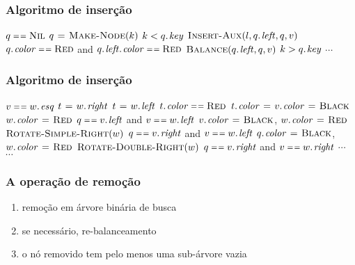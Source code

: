 \documentclass{beamer}
\begin{document}
\begin{frame}
\frametitle{Algoritmo de inserção}
\begin{codebox}
\li \If $q \isequal \const{Nil}$
\li \Then 
      $q \mathrel{\hspace{1pt}=\hspace{1pt}} \textnormal{\scshape Make-Node}(k)$
\li \ElseIf $k < \attrib{q}{key}$
\li \Then
      $\proc{Insert-Aux}(l, \attrib{q}{left}, q, v)$
\li   \If $\attrib{q}{color} \isequal \const{Red}$ and $\attrib{\attrib{q}{left}}{color} \isequal \const{Red}$
\li   \Then
        $\proc{Balance}(\attrib{q}{left}, q, v)$
      \End
\li \ElseIf $k > \attrib{q}{key}$
\li \Then
      $\cdots$
    \End    
\end{codebox}

\end{frame}

\begin{frame}
\frametitle{Algoritmo de inserção}
\begin{small}
\begin{codebox}
\li \If $v \isequal \attrib{w}{esq}$
\li \Then 
      $t \gets \attrib{w}{right}$
\li \Else
      $t \gets \attrib{w}{left}$
    \End
\li \If $\attrib{t}{color} \isequal \const{Red}$
\li \Then
      $\attrib{t}{color} \gets \attrib{v}{color} \gets \const{Black}$
\li   $\attrib{w}{color} \gets \const{Red}$
\li \Else
      \If $q \isequal \attrib{v}{left}$ and $v \isequal \attrib{w}{left}$
\li   \Then
        $\attrib{v}{color} \gets \const{Black}$, $\attrib{w}{color} \gets \const{Red}$
\li     $\textnormal{\scshape Rotate-Simple-Right}(w)$
\li   \ElseIf $q \isequal \attrib{v}{right}$ and $v \isequal \attrib{w}{left}$
\li     \Then
          $\attrib{q}{color} \gets \const{Black}$, $\attrib{w}{color} \gets \const{Red}$
\li     $\textnormal{\scshape Rotate-Double-Right}(w)$
\li   \ElseIf $q \isequal \attrib{v}{right}$ and $v \isequal \attrib{w}{right}$
\li     $\cdots$
\li   \ElseNoIf
\li     $\cdots$
      \End
    \End
\end{codebox}
\end{small}
\end{frame}

\begin{frame}
\frametitle{A operação de remoção}

\begin{enumerate}

\item remoção em árvore binária de busca

\item \alert{se necessário}, re-balanceamento

\item o nó removido tem pelo menos uma sub-árvore vazia

\end{enumerate}

\end{frame}
\end{document}
